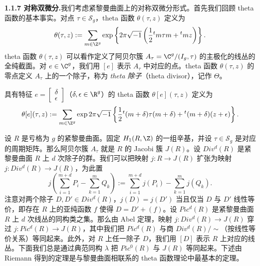 \noindent\textbf{1.1.7 对称双微分.}\quad 我们考虑紧黎曼曲面上的对称双微分形式。首先我们回顾 theta 函数的基本事实。对点 $\tau\in\mathscr{S}_g$，theta 函数 $\theta(\tau,z)$ 定义为
\[
  \theta(\tau,z):=\sum_{m\in\Z^g}\exp\left\{2\pi\sqrt{-1}\left(\frac{1}{2}{}^tm\tau m+{}^tmz\right)\right\}.
\]
theta 函数 $\theta(\tau,z)$ 可以看作定义了阿贝尔簇 $A_\tau=\C^g/(I_g,\tau)$ 的主极化的线丛的全纯截面。对 $e\in\C^g$，我们用 $[e]$ 表示 $A_\tau$ 中对应的点。theta 函数 $\theta(\tau,z)$ 的零点定义 $A_\tau$ 上的一个除子，称为 \emph{theta 除子}（theta divisor），记作 $\Theta$。

具有特征 $e=\begin{bmatrix}\delta\\ \epsilon\end{bmatrix}$（$\delta,\epsilon\in\R^g$）的 theta 函数 $\theta[e](\tau,z)$ 定义为
\[
  \theta[e](\tau,z):=\sum_{m\in\Z^g}\exp 2\pi\sqrt{-1}\left\{\frac{1}{2}{}^t(m+\delta)\tau(m+\delta)+{}^t(m+\delta)(z+\epsilon)\right\}.
\]

设 $R$ 是亏格为 $g$ 的紧黎曼曲面。固定 $H_1(R,\Z)$ 的一组辛基，并设 $\tau\in\mathscr{S}_g$ 是对应的周期矩阵。那么阿贝尔簇 $A_\tau$ 就是 $R$ 的 Jacobi 簇 $J(R)$。设 $Div^d(R)$ 是紧黎曼曲面 $R$ 上 $d$ 次除子的群。我们可以把映射 $j:R\to J(R)$ 扩张为映射 $j:Div^d(R)\to J(R)$，为此置
\[
  j\left(\sum_{i=1}^{m+d}P_i-\sum_{k=1}^m Q_k\right)
  :=\sum_{i=1}^{m+d}j(P_i)-\sum_{k=1}^m j(Q_k).
\]
注意对两个除子 $D,D'\in Div^d(R)$，$j(D)=j(D')$ 当且仅当 $D$ 与 $D'$ 线性等价，即存在 $R$ 上的亚纯函数 $f$ 使得 $D=D'+(f)$。设 $Pic^d(R)$ 是紧黎曼曲面 $R$ 上 $d$ 次线丛的同构类之集。那么由 Abel 定理，映射 $j:Div^d(R)\to J(R)$ 穿过 $j:Pic^d(R)\to J(R)$，其中我们把 $Pic^d(R)$ 与商 $Div^d(R)/\sim$（按线性等价关系）等同起来。此外，对 $R$ 上任一除子 $D$，我们用 $[D]$ 表示 $R$ 上对应的线丛。下面我们总是通过典范同构 $\lambda$ 把 $Pic^0(R)$ 与 $J(R)$ 等同起来。下述由 Riemann 得到的定理是与黎曼曲面相联系的 theta 函数理论中最基本的定理。


